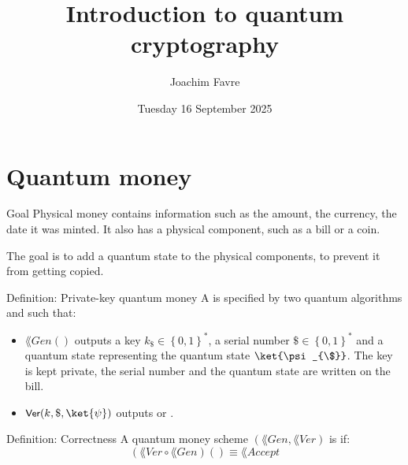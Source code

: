 \documentclass[a4paper]{article}
\title{Introduction to quantum cryptography}
\author{Joachim Favre}
\date{Tuesday 16 September 2025}
\begin{document}
\maketitle


\section{Quantum money}

\begin{parag}{Goal}
    Physical money contains information such as the amount, the currency, the date it was minted. It also has a physical component, such as a bill or a coin.

    The goal is to add a quantum state to the physical components, to prevent it from getting copied. 
\end{parag}

\begin{parag}{Definition: Private-key quantum money}
    A  is specified by two quantum algorithms  and  such that: 
    \begin{itemize}
        \item $\lang{Gen}\left(\right)$ outputs a key $k_{\$} \in \left\{0, 1\right\}^*$, a serial number $\$ \in \left\{0, 1\right\}^*$ and a quantum state representing the quantum state $\ket{\psi_{\$}}$. The key is kept private, the serial number and the quantum state are written on the bill.
        \item $\lang{Ver}\left(k, \$, \ket{\psi}\right)$ outputs  or .
    \end{itemize}
\end{parag}

\begin{parag}{Definition: Correctness}
    A quantum money scheme $\left(\lang{Gen}, \lang{Ver}\right)$ is  if: 
    \[\left(\lang{Ver} \circ \lang{Gen}\right)\left(\right) \equiv \lang{Accept}\]
\end{parag}
\end{document}
